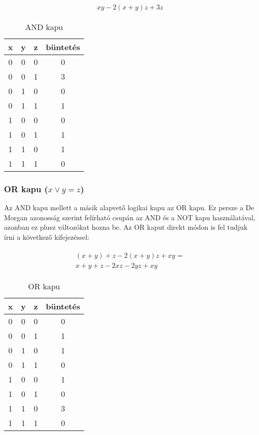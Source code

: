 \begin{align}
	xy-2(x+y)z+3z
\end{align}

\begin{table}[ht]
	\footnotesize
	\centering
	\begin{tabular}{ c c c c }
		\toprule
		x & y & z & büntetés \\
		\midrule
		0 & 0 & 0 & 0 \\
		0 & 0 & 1 & 3 \\
		0 & 1 & 0 & 0 \\
		0 & 1 & 1 & 1 \\
		1 & 0 & 0 & 0 \\
		1 & 0 & 1 & 1 \\
		1 & 1 & 0 & 1 \\
		1 & 1 & 1 & 0 \\		
		\bottomrule
	\end{tabular}
	\caption{AND kapu}
	\label{tab:ANDgate}
\end{table}

\subsubsection{OR kapu ($x \vee y = z$)}

Az AND kapu mellett a másik alapvető logikai kapu az OR kapu. Ez persze a De Morgan azonosság szerint felírható csupán az AND és a NOT kapu használatával, azonban ez plusz változókat hozna be. Az OR kaput direkt módon is fel tudjuk írni a következő kifejezéssel: 

\begin{align}	
\begin{split}
	(x+y)+z-2(x+y)z+xy = \\
	x+y+z-2xz-2yz+xy	
\end{split}
\end{align}

\begin{table}[ht]
	\footnotesize
	\centering
	\begin{tabular}{ c c c c }
		\toprule
		x & y & z & büntetés \\
		\midrule
		0 & 0 & 0 & 0 \\
		0 & 0 & 1 & 1 \\
		0 & 1 & 0 & 1 \\
		0 & 1 & 1 & 0 \\
		1 & 0 & 0 & 1 \\
		1 & 0 & 1 & 0 \\
		1 & 1 & 0 & 3 \\
		1 & 1 & 1 & 0 \\		
		\bottomrule
	\end{tabular}
	\caption{OR kapu}
	\label{tab:ORgate}
\end{table}

